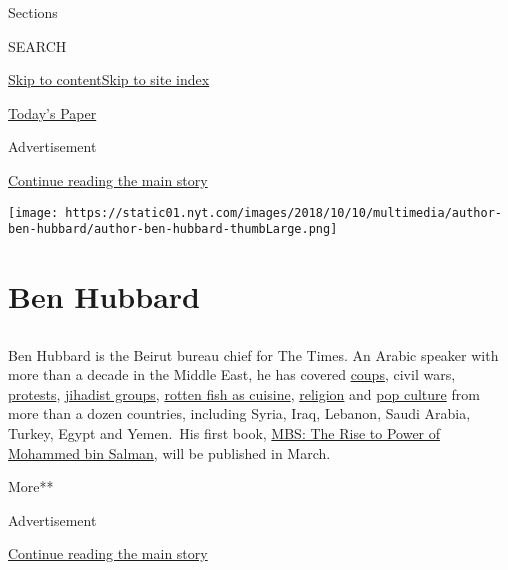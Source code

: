 Sections

SEARCH

\protect\hyperlink{site-content}{Skip to
content}\protect\hyperlink{site-index}{Skip to site index}

\href{https://myaccount.nytimes.com/auth/login?response_type=cookie\&client_id=vi}{}

\href{https://www.nytimes.com/section/todayspaper}{Today's Paper}

Advertisement

\protect\hyperlink{after-top}{Continue reading the main story}

\texttt{[image: https://static01.nyt.com/images/2018/10/10/multimedia/author-ben-hubbard/author-ben-hubbard-thumbLarge.png]}

\hypertarget{ben-hubbard}{%
\section{Ben Hubbard}\label{ben-hubbard}}

\subsection{}

Ben Hubbard is the Beirut bureau chief for The Times. An Arabic speaker
with more than a decade in the Middle East, he has covered
\href{https://www.nytimes.com/2016/07/23/world/middleeast/failed-turkish-coup-accelerated-a-purge-years-in-the-making.html}{coups},
civil wars,
\href{http://www.nytimes.com/2013/08/10/world/middleeast/in-cairo-camps-protesters-dig-in-and-live-on.html}{protests},
\href{https://www.nytimes.com/2014/07/24/world/middleeast/islamic-state-controls-raqqa-syria.html}{jihadist
groups},
\href{http://www.nytimes.com/2013/05/07/world/middleeast/a-taste-of-spring-that-reeks-of-tradition.html}{rotten
fish as cuisine},
\href{https://www.nytimes.com/2016/07/11/world/middleeast/saudi-arabia-islam-wahhabism-religious-police.html}{religion}
and
\href{https://www.nytimes.com/2017/05/16/world/middleeast/isis-ramadan-tv-drama.html}{pop
culture} from more than a dozen countries, including Syria, Iraq,
Lebanon, Saudi Arabia, Turkey, Egypt and Yemen.~His first book,
\href{https://www.penguinrandomhouse.com/books/601932/mbs-by-ben-hubbard/}{MBS:
The Rise to Power of Mohammed bin Salman}, will be published in March.

More**

Advertisement

\protect\hyperlink{after-mid1}{Continue reading the main story}

